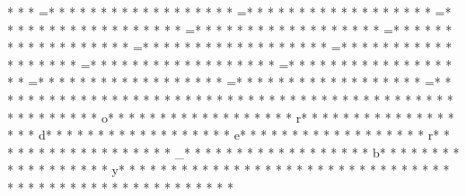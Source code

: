 * *  * =* * *  * * *  * * *  *  * * *  *  * * *  * =* * *  * * *  * * *  *  * * *  *  * * *  * =* * *  * * *  * * *  *  * * *  *  * * *  * =* * *  * * *  * * *  *  * * *  *  * * *  * =* * *  * * *  * * *  *  * * *  *  * * *  * =* * *  * * *  * * *  *  * * *  *  * * *  * =* * *  * * *  * * *  *  * * *  *  * * *  * =* * *  * * *  * * *  *  * * *  *  * * *  * =* * *  * * *  * * *  *  * * *  *  * * *  * =* * *  * * *  * * *  *  * * *  *  * * *  * =* * *  * * *  * * *  *  * * *  *  * * *  * =* * *  * * *  * * *  *  * * *  *  * * *  * %
* * *  * * *  * * *  *  * * *  *  * * *  * 
* * *  * * *  * * *  *  * * *  *  * * *  * o* * *  * * *  * * *  *  * * *  *  * * *  * r* * *  * * *  * * *  *  * * *  *  * * *  * d* * *  * * *  * * *  *  * * *  *  * * *  * e* * *  * * *  * * *  *  * * *  *  * * *  * r* * *  * * *  * * *  *  * * *  *  * * *  * _* * *  * * *  * * *  *  * * *  *  * * *  * b* * *  * * *  * * *  *  * * *  *  * * *  * y* * *  * * *  * * *  *  * * *  *  * * *  *  * * *  * * *  * * *  *  * * *  *  * * *  * 
* * *  * * *  * * *  *  * * *  *  * * *  * 
